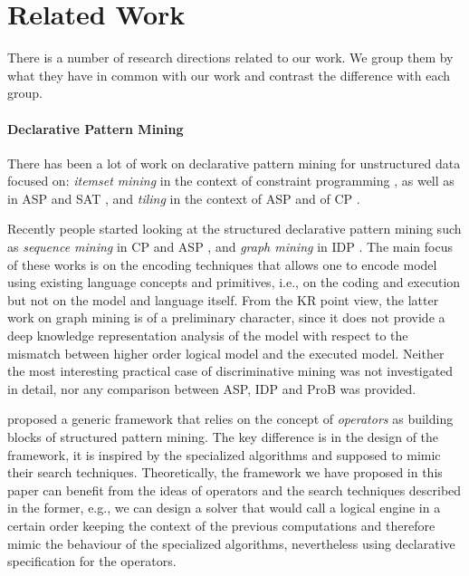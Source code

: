 \section{Related Work}\label{sec:related_work}
There is a number of research directions related to our work. We group them by what they have in common with our work and contrast the difference with each group.

\paragraph{Declarative Pattern Mining} There has been a lot of work on declarative pattern mining for unstructured data focused on: \textit{itemset mining} in the context of constraint programming \citep{tias_original,mining_cp_extra,tias_declarative_pattern_mining}, as well as in ASP \citep{asp_itemset} and SAT \citep{itemset_sat}, and \textit{tiling} in the context of ASP \citep{relational_decomposition} and of CP \citep{ranked_tiling}. 

Recently people started looking at the structured declarative pattern mining such as \textit{sequence mining} in CP \citep{cp_sequence_mining} and ASP \citep{rennes_asp_sequences}, and \textit{graph mining} in IDP \citep{ilp_graph_mining}.  The main focus of these works is on the encoding techniques that allows one to encode model using existing language concepts and primitives, i.e., on the coding and execution but not on the model and language itself. From the KR point view, the latter work on graph mining is of a preliminary character, since it does not provide a deep knowledge representation analysis of the model with respect to the mismatch between higher order logical model and the executed model. Neither the most interesting practical case of discriminative mining was not investigated in detail, nor any comparison between ASP, IDP and ProB was provided. 

\citet{declarative_structured_language} proposed a generic framework that relies on the concept of \textit{operators} as building blocks of structured pattern mining. The key difference is in the design of the framework, it is inspired by the specialized algorithms and supposed to mimic their search techniques. Theoretically, the framework we have proposed in this paper can benefit from the ideas of operators and the search techniques described in the former, e.g., we can design a solver that would call a logical engine in a certain order keeping the context of the previous computations and therefore mimic the behaviour of the specialized algorithms, nevertheless using declarative specification for the operators.

